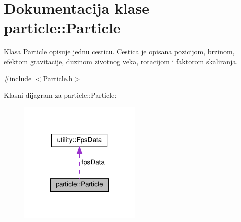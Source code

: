 \hypertarget{classparticle_1_1Particle}{}\section{Dokumentacija klase particle\+:\+:Particle}
\label{classparticle_1_1Particle}


Klasa \hyperlink{classparticle_1_1Particle}{Particle} opisuje jednu cesticu. Cestica je opisana pozicijom, brzinom, efektom gravitacije, duzinom zivotnog veka, rotacijom i faktorom skaliranja.  




{\ttfamily \#include $<$Particle.\+h$>$}



Klasni dijagram za particle\+:\+:Particle\+:
\nopagebreak
\begin{figure}[H]
\begin{center}
\leavevmode
\includegraphics[width=167pt]{classparticle_1_1Particle__coll__graph}
\end{center}
\end{figure}
